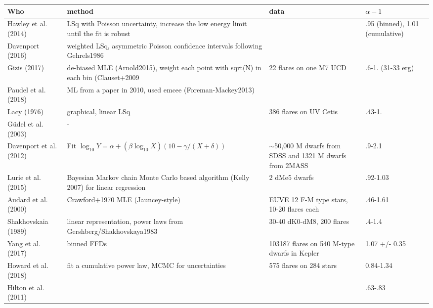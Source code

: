 
\begin{tabular}{lL{6cm}L{4cm}l}
\toprule
                      Who &                                                                                  method &                                                          data &      $\alpha-1$ \\
\midrule
  Hawley et al. (2014)    &    LSq with Poisson uncertainty, increase the low energy limit until the fit is robust  &                                                               &     .95 (binned), 1.01 (cumulative)      \\
  Davenport (2016)        &            weighted LSq, asymmetric Poisson confidence intervals following Gehrels1986  &                                                               &                 \\
  Gizis  (2017)           &    de-biased MLE (Arnold2015), weight each point with sqrt(N) in each bin (Clauset+2009 &                                                              22 flares on one M7 UCD &   .6-1. (31-33 erg)              \\
  Paudel et al. (2018)    &                               ML from a paper in 2010, used emcee (Foreman-Mackey2013)  &                                                               &                 \\
  Lacy (1976)             &                                                                  graphical, linear LSq  &                                        386 flares on UV Cetis &         .43-1.  \\
  Güdel et al.(2003)      &      -                                                                                   &                                                               &                 \\
  Davenport et al. (2012) &              Fit $\log_{10} Y = \alpha + (\beta \log_{10} X)(10 -\gamma /(X+\delta) )$  &  $\sim$50,000 M dwarfs from SDSS and 1321 M dwarfs from 2MASS &          .9-2.1 \\
  Lurie et al. (2015)     &   Bayesian Markov chain Monte Carlo based algorithm (Kelly 2007) for linear regression  &                                                2 dMe5 dwarfs  &        .92-1.03 \\
  Audard et al. (2000)    &                                                      Crawford+1970 MLE (Jauncey-style)  &                    EUVE 12 F-M type stars, 10-20 flares each  &        .46-1.61 \\
  Shakhovskaia (1989)     &                      linear representation, power laws from Gershberg/Shakhovskaya1983  &                                     30-40 dK0-dM8, 200 flares &          .4-1.4 \\
  Yang et al. (2017)      &                                                                            binned FFDs  &                 103187 flares on 540 M-type dwarfs in Kepler  &   1.07 +/- 0.35 \\
  Howard et al. (2018)    & fit a cumulative power law, MCMC for uncertainties &575 flares on 284 stars & 0.84-1.34\\
  Hilton et al. (2011) &&&.63-.83\\ 
\bottomrule
\end{tabular}
